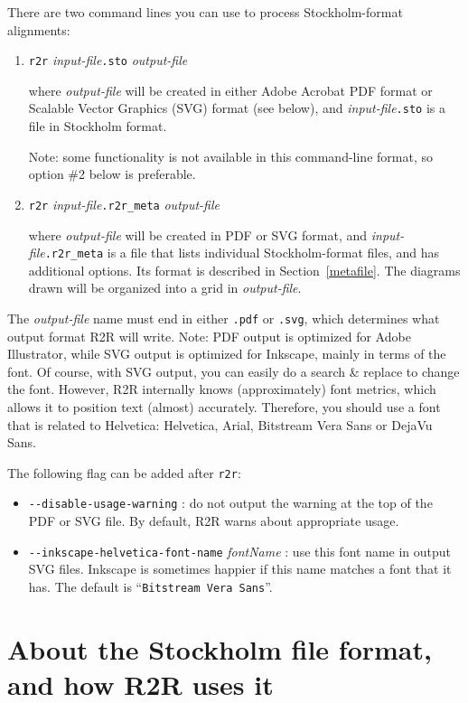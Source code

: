 \documentclass[letterpaper,12pt]{report}
\begin{document}
There are two command lines you can use to process Stockholm-format alignments:

\begin{enumerate}
\item {\tt r2r} {\it input-file}{\tt .sto} {\it output-file}

where {\it output-file} will be created in either Adobe Acrobat PDF format or Scalable Vector Graphics (SVG) format (see below),
and {\it input-file}{\tt .sto} is a file in Stockholm format.

Note: some functionality is not available in this command-line format, so option \#2 below is preferable.
\item {\tt r2r} {\it input-file}{\tt .r2r\_meta} {\it output-file}

where {\it output-file} will be created in PDF or SVG format,
and {\it input-file}{\tt .r2r\_meta} is a file that lists individual Stockholm-format files,
and has additional options.
Its format is described in Section~\ref{metafile}.
The diagrams drawn will be organized into a grid in {\it output-file}.
\end{enumerate}

The {\it output-file} name must end in either {\tt .pdf} or {\tt .svg}, which determines what output format
R2R will write.
Note: PDF output is optimized for Adobe Illustrator, while SVG output is optimized for Inkscape, mainly in terms
of the font.
Of course, with SVG output, you can easily do a search \& replace to change the font.
However, R2R internally knows (approximately) font metrics, which allows it to position text (almost) accurately.
Therefore, you should use a font that is related to Helvetica: Helvetica, Arial, Bitstream Vera Sans or DejaVu Sans.

The following flag can be added after {\tt r2r}:
\begin{itemize}
\item {\tt -{}-disable-usage-warning} : do not output the warning at the top of the PDF or SVG file.  By default, R2R warns about appropriate usage.
\item {\tt -{}-inkscape-helvetica-font-name} {\it fontName} : use this font name in output SVG files.  Inkscape is sometimes happier if this name matches a font that it has.  The default is ``{\tt Bitstream Vera Sans}''.
\end{itemize}

\section{About the Stockholm file format, and how R2R uses it}
\end{document}
